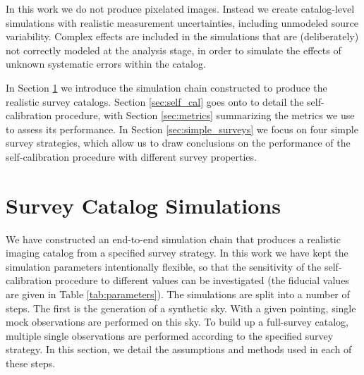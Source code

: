 \documentclass[preprint,pdftex]{aastex}
\begin{document}
In this work we do not produce pixelated images.  Instead we create catalog-level simulations with realistic measurement uncertainties, including unmodeled source variability.  Complex effects are included in the simulations that are (deliberately) not correctly modeled at the analysis stage, in order to simulate the effects of unknown systematic errors within the catalog.

In Section \ref{sec:survey_simulations} we introduce the simulation chain constructed to produce the realistic survey catalogs. Section \ref{sec:self_cal} goes onto to detail the self-calibration procedure, with Section \ref{sec:metrics} summarizing the metrics we use to assess its performance. In Section \ref{sec:simple_surveys} we focus on four simple survey strategies, which allow us to draw conclusions on the performance of the self-calibration procedure with different survey properties. 

\section{Survey Catalog Simulations}
\label{sec:survey_simulations}
We have constructed an end-to-end simulation chain that produces a realistic imaging catalog from a specified survey strategy. In this work we have kept the simulation parameters intentionally flexible, so that the sensitivity of the self-calibration procedure to different values can be investigated (the fiducial values are given in Table \ref{tab:parameters}). The simulations are split into a number of steps. The first is the generation of a synthetic sky. With a given pointing, single mock observations are performed on this sky. To build up a full-survey catalog, multiple single observations are performed according to the specified survey strategy. In this section, we detail the assumptions and methods used in each of these steps. 
\end{document}
